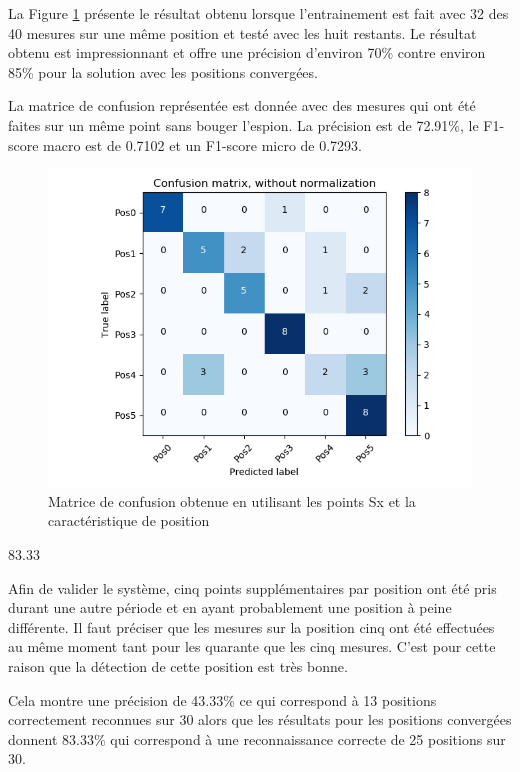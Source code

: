 La Figure \ref{fig:matPosSxTPos} présente le résultat obtenu lorsque l'entrainement est fait avec 32 des 40 mesures sur une même position et testé avec les huit restants. Le résultat obtenu est impressionnant et offre une précision d'environ 70\% contre environ 85\% pour la solution avec les positions convergées. 

La matrice de confusion représentée est donnée avec des mesures qui ont été faites sur un même point sans bouger l'espion. La précision est de 72.91\%, le F1-score macro est de 0.7102 et un F1-score micro de 0.7293.  
\begin{figure}[htp]
 \begin{center}
  \includegraphics[scale=0.5]{figures/mat_pos_Sx_pos.png}
  \caption{Matrice de confusion obtenue en utilisant les points Sx et la caractéristique de position}
  \label{fig:matPosSxTPos} %
 \end{center}
\end{figure}
83.33%

Afin de valider le système, cinq points supplémentaires par position ont été pris durant une autre période et en ayant probablement une position à peine différente. Il faut préciser que les mesures sur la position cinq ont été effectuées au même moment tant pour les quarante que les cinq mesures. C'est pour cette raison que la détection de cette position est très bonne. 

Cela montre une précision de 43.33\% ce qui correspond à 13 positions correctement reconnues sur 30 alors que les résultats pour les positions convergées donnent 83.33\% qui correspond à une reconnaissance correcte de 25 positions sur 30.

